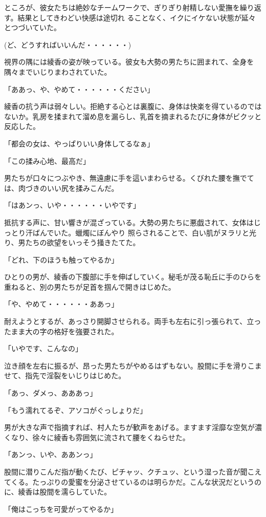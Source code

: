 ﻿\documentclass[book,tate]{jlreq}
\begin{document}
ところが、彼女たちは絶妙なチームワークで、ぎりぎり射精しない愛撫を繰り返す。結果としてきわどい快感は途切れ ることなく、イクにイケない状態が延々とつづいていた。

(ど、どうすればいいんだ・・・・・・)

視界の隅には綾香の姿が映っている。彼女も大勢の男たちに囲まれて、全身を隅々までいじりまわされていた。

「ああっ、や、やめて・・・・・・ください」

綾香の抗う声は弱々しい。拒絶する心とは裏腹に、身体は快楽を得ているのではないか。乳房を揉まれて溜め息を漏らし、乳首を摘まれるたびに身体がビクッと反応した。

「都会の女は、やっぱりいい身体してるなぁ」

「この揉み心地、最高だ」

男たちが口々につぶやき、無遠慮に手を這いまわらせる。くびれた腰を撫でては、肉づきのいい尻を揉みこんだ。

「はあンっ、いや・・・・・・いやです」

抵抗する声に、甘い響きが混ざっている。大勢の男たちに悪戯されて、女体はじっとり汗ばんでいた。蠟燭にぼんやり 照らされることで、白い肌がヌラリと光り、男たちの欲望をいっそう掻きたてた。

「どれ、下のほうも触ってやるか」

ひとりの男が、綾香の下腹部に手を伸ばしていく。秘毛が茂る恥丘に手のひらを重ねると、別の男たちが足首を掴んで開きはじめた。

「や、やめて・・・・・・ああっ」

耐えようとするが、あっさり開脚させられる。両手も左右に引っ張られて、立ったまま大の字の格好を強要された。

「いやです、こんなの」

泣き顔を左右に振るが、昂った男たちがやめるはずもない。股間に手を滑りこませて、指先で淫裂をいじりはじめた。

「あっ、ダメっ、あああっ」

「もう濡れてるぞ、アソコがぐっしょりだ」

男が大きな声で指摘すれば、村人たちが歓声をあげる。ますます淫靡な空気が濃くなり、徐々に綾香も雰囲気に流されて腰をくねらせた。

「あンっ、いや、ああンっ」

股間に潜りこんだ指が動くたび、ピチャッ、クチュッ、という湿った音が聞こえてくる。たっぷりの愛蜜を分泌させているのは明らかだ。こんな状況だというのに、綾香は股間を濡らしていた。

「俺はこっちを可愛がってやるか」
\end{document}
